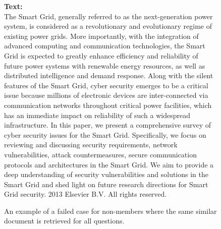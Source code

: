 \begin{figure*}[ht!]
\begin{tcolorbox}
    \textbf{Text:}\\[0.5em]
    The Smart Grid, generally referred to as the next-generation power system, is considered as a revolutionary and evolutionary regime of existing power grids. More importantly, with the integration of advanced computing and communication technologies, the Smart Grid is expected to greatly enhance efficiency and reliability of future power systems with renewable energy resources, as well as distributed intelligence and demand response. Along with the silent features of the Smart Grid, cyber security emerges to be a critical issue because millions of electronic devices are inter-connected via communication networks throughout critical power facilities, which has an immediate impact on reliability of such a widespread infrastructure. In this paper, we present a comprehensive survey of cyber security issues for the Smart Grid. Specifically, we focus on reviewing and discussing security requirements, network vulnerabilities, attack countermeasures, secure communication protocols and architectures in the Smart Grid. We aim to provide a deep understanding of security vulnerabilities and solutions in the Smart Grid and shed light on future research directions for Smart Grid security. 2013 Elsevier B.V. All rights reserved.\\[1em]

    \end{tcolorbox}
    \caption{An example of a failed case for non-members where the same similar document is retrieved for all questions.}
    \label{fig:failed_example_2}
\end{figure*}
